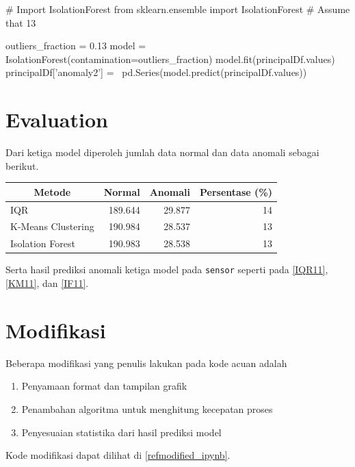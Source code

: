 \begin{python}
# Import IsolationForest
from sklearn.ensemble import IsolationForest
# Assume that 13%
    
outliers_fraction = 0.13
model =  IsolationForest(contamination=outliers_fraction)
model.fit(principalDf.values) 
principalDf['anomaly2'] = \
    pd.Series(model.predict(principalDf.values))
\end{python}

    \section{Evaluation}

    Dari ketiga model diperoleh jumlah data normal dan data anomali sebagai berikut.

    \begin{table}[h]
        \centering
        \begin{tabular}{|l|r|r|r|}
            \hline
            \multicolumn{1}{|c|}{\textbf{Metode}} & \multicolumn{1}{c|}{\textbf{Normal}} & \multicolumn{1}{c|}{\textbf{Anomali}} & \multicolumn{1}{c|}{\textbf{Persentase (\%)}} \\ \hline
            IQR                & 189.644 & 29.877 & 14 \\ \hline
            K-Means Clustering & 190.984 & 28.537 & 13 \\ \hline
            Isolation Forest   & 190.983 & 28.538 & 13 \\ \hline
        \end{tabular}
    \end{table}

    Serta hasil prediksi anomali ketiga model pada \texttt{sensor} seperti pada \ref{IQR11}, \ref{KM11}, dan \ref{IF11}.

\section{Modifikasi}
Beberapa modifikasi yang penulis lakukan pada kode acuan adalah
\begin{enumerate}
    \item Penyamaan format dan tampilan grafik
    \item Penambahan algoritma untuk menghitung kecepatan proses
    \item Penyesuaian statistika dari hasil prediksi model
\end{enumerate}
Kode modifikasi dapat dilihat di \ref{refmodified_ipynb}.